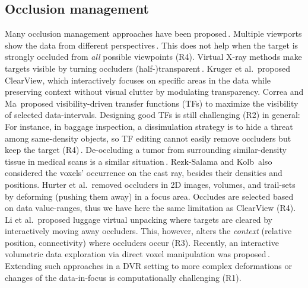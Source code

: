 \subsection{Occlusion management}
%
Many occlusion management approaches have been proposed\,\cite{4483791}. Multiple viewports show the data from different perspectives\,\cite{WangBaldonado:2000:GUM:345513.345271}. This does not help when the target is strongly occluded from \emph{all} possible viewpoints (R4). Virtual X-ray methods make targets visible by turning occluders (half-)transparent\,\cite{Burns:2008:ACC:1457515.1409107}. Kruger et al.\,\cite{4015450} proposed ClearView, which interactively focuses on specific areas in the data while preserving context without visual clutter by modulating transparency. Correa and Ma\,\cite{5416704} proposed visibility-driven transfer functions (TFs) to maximize the visibility of selected data-intervals. Designing good TFs is still challenging (R2) in general: For instance, in baggage inspection, a dissimulation strategy is to hide a threat among same-density objects, so TF editing cannot easily remove occluders but keep the target (R4)\,\cite{7819413}. De-occluding a tumor from surrounding similar-density tissue in medical scans is a similar situation\,\cite{CGF:CGF12927}. 
Rezk-Salama and Kolb\,\cite{CGF:CGF979} also considered the voxels' occurrence on the cast ray, besides their densities and positions. Hurter et al.\,\cite{moleview,6787171} removed occluders in 2D images, volumes, and trail-sets by deforming (pushing them away) in a focus area. Occludes are selected based on data value-ranges, thus we have here the same limitation as ClearView (R4). Li et al.\,\cite{Li:2012:LVV:2425296.2425325} proposed luggage virtual unpacking where targets are cleared by interactively moving away occluders. This, however, alters the \emph{context} (relative position, connectivity) where occluders occur (R3). Recently, an interactive volumetric data exploration via direct voxel manipulation was proposed\,\cite{7819413}. Extending such approaches in a DVR setting to more complex deformations or changes of the data-in-focus is computationally challenging (R1).

\vspace{-0.15cm}
